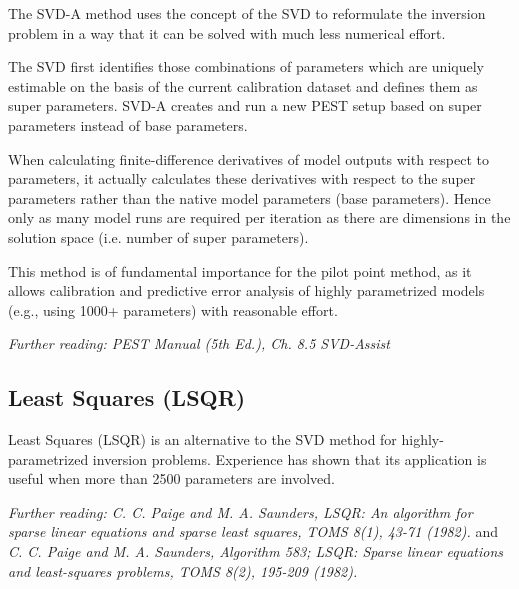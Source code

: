 The SVD-A method uses the concept of the SVD to reformulate the inversion problem in a way that it can be solved with much less numerical effort. 

The SVD first identifies those combinations of parameters which are uniquely estimable on the basis of the current calibration dataset and defines them as super parameters. SVD-A creates and run a new PEST setup based on super parameters instead of base parameters. 

When calculating finite-difference derivatives of model outputs with respect to parameters, it actually calculates these derivatives with respect to the super parameters rather than the native model parameters (base parameters). Hence only as many model runs are required per iteration as there are dimensions in the solution space (i.e. number of super parameters).

This method is of fundamental importance for the pilot point method, as it allows calibration and predictive error analysis of highly parametrized models (e.g., using 1000+ parameters) with reasonable effort. 

\textit{Further reading: PEST Manual (5th Ed.), Ch. 8.5 SVD-Assist}

\subsection{Least Squares (LSQR)}

Least Squares (LSQR) is an alternative to the SVD method for highly-parametrized inversion problems. Experience has shown that its application is useful when more than 2500 parameters are involved.

\textit{Further reading: C. C. Paige and M. A. Saunders, LSQR: An algorithm for sparse linear equations and sparse least squares, TOMS 8(1), 43-71 (1982).} and \textit{C. C. Paige and M. A. Saunders, Algorithm 583; LSQR: Sparse linear equations and least-squares problems, TOMS 8(2), 195-209 (1982).}
